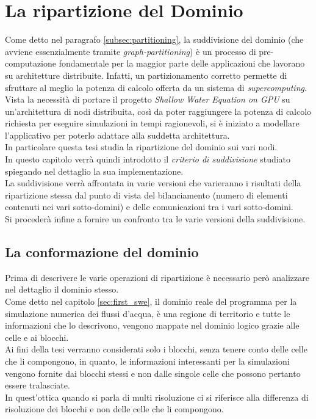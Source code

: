 
\section{La ripartizione del Dominio}\label{sec:fourth_sudd_dom}
Come detto nel paragrafo \ref{subsec:partitioning}, la suddivisione del dominio (che avviene essenzialmente tramite \textit{graph-partitioning}) è un processo di pre-computazione fondamentale per la maggior parte delle applicazioni che lavorano su architetture distribuite. Infatti, un partizionamento corretto permette di sfruttare al meglio la potenza di calcolo offerta da un sistema di \textit{supercomputing}.\\
Vista la necessità di portare il progetto \textit{Shallow Water Equation on GPU} su un'architettura di nodi distribuita, così da poter raggiungere la potenza di calcolo richiesta per eseguire simulazioni in tempi ragionevoli, si è iniziato a modellare l'applicativo per poterlo adattare alla suddetta architettura.\\
In particolare questa tesi studia la ripartizione del dominio sui vari nodi.\\
In questo capitolo verrà quindi introdotto il \textit{criterio di suddivisione} studiato spiegando nel dettaglio la sua implementazione.\\
La suddivisione verrà affrontata in varie versioni che varieranno i risultati della ripartizione stessa dal punto di vista del bilanciamento (numero di elementi contenuti nei vari sotto-domini) e delle comunicazioni tra i vari sotto-domini.\\
Si procederà infine a fornire un confronto tra le varie versioni della suddivisione.

\subsection{La conformazione del dominio}
Prima di descrivere le varie operazioni di ripartizione è necessario però analizzare nel dettaglio il dominio stesso.\\
Come detto nel capitolo \ref{sec:first_swe}, il dominio reale del programma per la simulazione numerica dei flussi d’acqua, è una regione di territorio e tutte le informazioni che lo descrivono, vengono mappate nel dominio logico grazie alle celle e ai blocchi.\\
Ai fini della tesi verranno considerati solo i blocchi, senza tenere conto delle celle che li compongono, in quanto, le informazioni interessanti per la simulazioni vengono fornite dai blocchi stessi e non dalle singole celle che possono pertanto essere tralasciate.\\
In quest'ottica quando si parla di multi risoluzione ci si riferisce alla differenza di risoluzione dei blocchi e non delle celle che li compongono.\\

